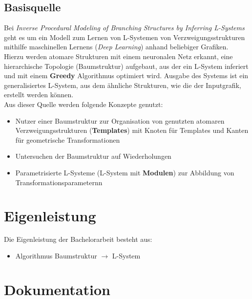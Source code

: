 \documentclass[11pt]{article}
\begin{document}
    \subsection{Basisquelle}
    Bei \textit{Inverse Procedural Modeling of Branching Structures by Inferring L-Systems}\cite{2} geht es um ein
    Modell zum Lernen von L-Systemen von Verzweigungsstrukturen mithilfe maschinellen Lernens (\textit{Deep
    Learning}) anhand beliebiger Grafiken.
    Hierzu werden atomare Strukturen mit einem neuronalen Netz erkannt, eine hierarchische Topologie (Baumstruktur)
    aufgebaut, aus der ein L-System inferiert und mit einem \textbf{Greedy} Algorithmus optimiert wird.
    Ausgabe des Systems ist ein generalisiertes L-System, aus dem ähnliche Strukturen, wie die der Inputgrafik,
    erstellt werden können.\\
    Aus dieser Quelle werden folgende Konzepte genutzt:
    \begin{itemize}
        \item Nutzer einer Baumstruktur zur Organisation von genutzten atomaren Verzweigungsstrukturen
        (\textbf{Templates}) mit Knoten für Templates und Kanten für geometrische Transformationen
        \item Untersuchen der Baumstruktur auf Wiederholungen
        \item Parametrisierte L-Systeme (L-System mit \textbf{Modulen}) zur Abbildung von Transformationsparameternn
    \end{itemize}


    \section{Eigenleistung}
    Die Eigenleistung der Bachelorarbeit besteht aus:
    \begin{itemize}
        \item Algorithmus Baumstruktur $\rightarrow$ L-System
    \end{itemize}

    \newpage

    \section{Dokumentation}
\end{document}
